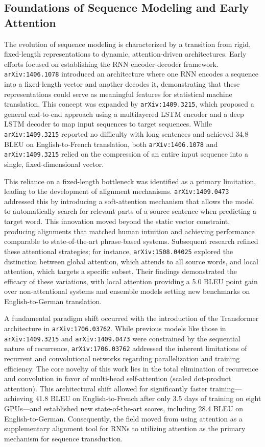 \documentclass[11pt]{article}
\begin{document}
\subsection{Foundations of Sequence Modeling and Early Attention}

The evolution of sequence modeling is characterized by a transition from rigid, fixed-length representations to dynamic, attention-driven architectures. Early efforts focused on establishing the RNN encoder-decoder framework. \texttt{arXiv:1406.1078} introduced an architecture where one RNN encodes a sequence into a fixed-length vector and another decodes it, demonstrating that these representations could serve as meaningful features for statistical machine translation. This concept was expanded by \texttt{arXiv:1409.3215}, which proposed a general end-to-end approach using a multilayered LSTM encoder and a deep LSTM decoder to map input sequences to target sequences. While \texttt{arXiv:1409.3215} reported no difficulty with long sentences and achieved 34.8 BLEU on English-to-French translation, both \texttt{arXiv:1406.1078} and \texttt{arXiv:1409.3215} relied on the compression of an entire input sequence into a single, fixed-dimensional vector.

This reliance on a fixed-length bottleneck was identified as a primary limitation, leading to the development of alignment mechanisms. \texttt{arXiv:1409.0473} addressed this by introducing a soft-attention mechanism that allows the model to automatically search for relevant parts of a source sentence when predicting a target word. This innovation moved beyond the static vector constraint, producing alignments that matched human intuition and achieving performance comparable to state-of-the-art phrase-based systems. Subsequent research refined these attentional strategies; for instance, \texttt{arXiv:1508.04025} explored the distinction between global attention, which attends to all source words, and local attention, which targets a specific subset. Their findings demonstrated the efficacy of these variations, with local attention providing a 5.0 BLEU point gain over non-attentional systems and ensemble models setting new benchmarks on English-to-German translation.

A fundamental paradigm shift occurred with the introduction of the Transformer architecture in \texttt{arXiv:1706.03762}. While previous models like those in \texttt{arXiv:1409.3215} and \texttt{arXiv:1409.0473} were constrained by the sequential nature of recurrence, \texttt{arXiv:1706.03762} addressed the inherent limitations of recurrent and convolutional networks regarding parallelization and training efficiency. The core novelty of this work lies in the total elimination of recurrence and convolution in favor of multi-head self-attention (scaled dot-product attention). This architectural shift allowed for significantly faster training—achieving 41.8 BLEU on English-to-French after only 3.5 days of training on eight GPUs—and established new state-of-the-art scores, including 28.4 BLEU on English-to-German. Consequently, the field moved from using attention as a supplementary alignment tool for RNNs to utilizing attention as the primary mechanism for sequence transduction.
\end{document}

